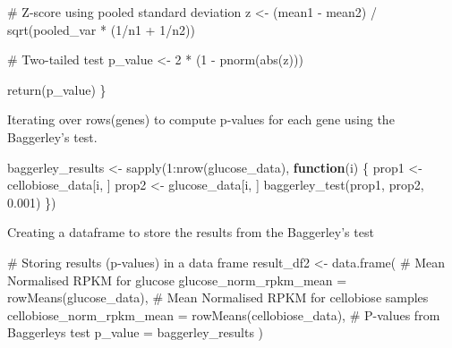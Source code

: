 \documentclass[
  letterpaper,
  DIV=11,
  numbers=noendperiod]{scrartcl}
\newenvironment{Shaded}{\begin{snugshade}}{\end{snugshade}}
\newcommand{\AttributeTok}[1]{\textcolor[rgb]{0.40,0.45,0.13}{#1}}
\newcommand{\CommentTok}[1]{\textcolor[rgb]{0.37,0.37,0.37}{#1}}
\newcommand{\ControlFlowTok}[1]{\textcolor[rgb]{0.00,0.23,0.31}{\textbf{#1}}}
\newcommand{\DecValTok}[1]{\textcolor[rgb]{0.68,0.00,0.00}{#1}}
\newcommand{\FloatTok}[1]{\textcolor[rgb]{0.68,0.00,0.00}{#1}}
\newcommand{\FunctionTok}[1]{\textcolor[rgb]{0.28,0.35,0.67}{#1}}
\newcommand{\NormalTok}[1]{\textcolor[rgb]{0.00,0.23,0.31}{#1}}
\newcommand{\OtherTok}[1]{\textcolor[rgb]{0.00,0.23,0.31}{#1}}
\newcommand{\SpecialCharTok}[1]{\textcolor[rgb]{0.37,0.37,0.37}{#1}}
\begin{document}
\begin{Shaded}
\begin{Highlighting}[]
  \CommentTok{\# Z{-}score using pooled standard deviation}
\NormalTok{  z }\OtherTok{\textless{}{-}}\NormalTok{ (mean1 }\SpecialCharTok{{-}}\NormalTok{ mean2) }\SpecialCharTok{/} \FunctionTok{sqrt}\NormalTok{(pooled\_var }\SpecialCharTok{*}\NormalTok{ (}\DecValTok{1}\SpecialCharTok{/}\NormalTok{n1 }\SpecialCharTok{+} \DecValTok{1}\SpecialCharTok{/}\NormalTok{n2))}
  
  \CommentTok{\# Two{-}tailed test}
\NormalTok{  p\_value }\OtherTok{\textless{}{-}} \DecValTok{2} \SpecialCharTok{*}\NormalTok{ (}\DecValTok{1} \SpecialCharTok{{-}} \FunctionTok{pnorm}\NormalTok{(}\FunctionTok{abs}\NormalTok{(z)))}
  
  \FunctionTok{return}\NormalTok{(p\_value)}
\NormalTok{\}}
\end{Highlighting}
\end{Shaded}

Iterating over rows(genes) to compute p-values for each gene using the
Baggerley's test.

\begin{Shaded}
\begin{Highlighting}[]
\NormalTok{baggerley\_results }\OtherTok{\textless{}{-}} \FunctionTok{sapply}\NormalTok{(}\DecValTok{1}\SpecialCharTok{:}\FunctionTok{nrow}\NormalTok{(glucose\_data), }\ControlFlowTok{function}\NormalTok{(i) \{}
\NormalTok{  prop1 }\OtherTok{\textless{}{-}}\NormalTok{ cellobiose\_data[i, ] }
\NormalTok{  prop2 }\OtherTok{\textless{}{-}}\NormalTok{ glucose\_data[i, ]   }
  \FunctionTok{baggerley\_test}\NormalTok{(prop1, prop2, }\FloatTok{0.001}\NormalTok{)}
\NormalTok{\})}
\end{Highlighting}
\end{Shaded}

Creating a dataframe to store the results from the Baggerley's test

\begin{Shaded}
\begin{Highlighting}[]
\CommentTok{\# Storing results (p{-}values) in a data frame}
\NormalTok{result\_df2 }\OtherTok{\textless{}{-}} \FunctionTok{data.frame}\NormalTok{(}
  \CommentTok{\# Mean Normalised RPKM for glucose}
  \AttributeTok{glucose\_norm\_rpkm\_mean =} \FunctionTok{rowMeans}\NormalTok{(glucose\_data),}
  \CommentTok{\# Mean Normalised RPKM for cellobiose samples}
  \AttributeTok{cellobiose\_norm\_rpkm\_mean =} \FunctionTok{rowMeans}\NormalTok{(cellobiose\_data),}
  \CommentTok{\# P{-}values from Baggerley\textquotesingle{}s test}
  \AttributeTok{p\_value =}\NormalTok{ baggerley\_results   }
\NormalTok{)}
\end{Highlighting}
\end{Shaded}
\end{document}
